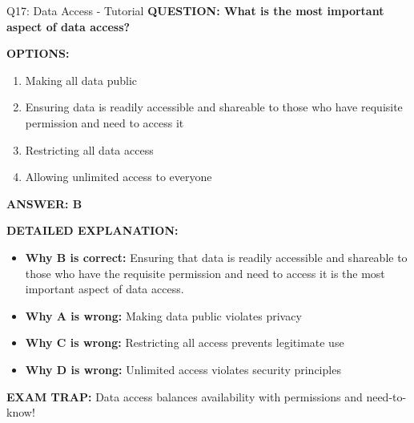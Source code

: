 \documentclass[8pt]{beamer}
\begin{document}
	\begin{frame}{Q17: Data Access - Tutorial}
		\fontsize{6.5}{7.5}\selectfont
		\textbf{QUESTION: What is the most important aspect of data access?}
		
		\vspace{0.1cm}
		\textbf{OPTIONS:}
		\begin{enumerate}
			\item Making all data public
			\item Ensuring data is readily accessible and shareable to those who have requisite permission and need to access it
			\item Restricting all data access
			\item Allowing unlimited access to everyone
		\end{enumerate}
		
		\vspace{0.1cm}
		\textcolor{myblue}{\textbf{ANSWER: B}}
		
		\vspace{0.1cm}
		\textbf{DETAILED EXPLANATION:}
		\begin{itemize}
			\item \textbf{Why B is correct:} Ensuring that data is readily accessible and shareable to those who have the requisite permission and need to access it is the most important aspect of data access.
			\item \textbf{Why A is wrong:} Making data public violates privacy
			\item \textbf{Why C is wrong:} Restricting all access prevents legitimate use
			\item \textbf{Why D is wrong:} Unlimited access violates security principles
		\end{itemize}
		
		\textcolor{myred}{\textbf{EXAM TRAP:}} Data access balances \textcolor{myblue}{availability with permissions and need-to-know}!
	\end{frame}
	
\end{document}
